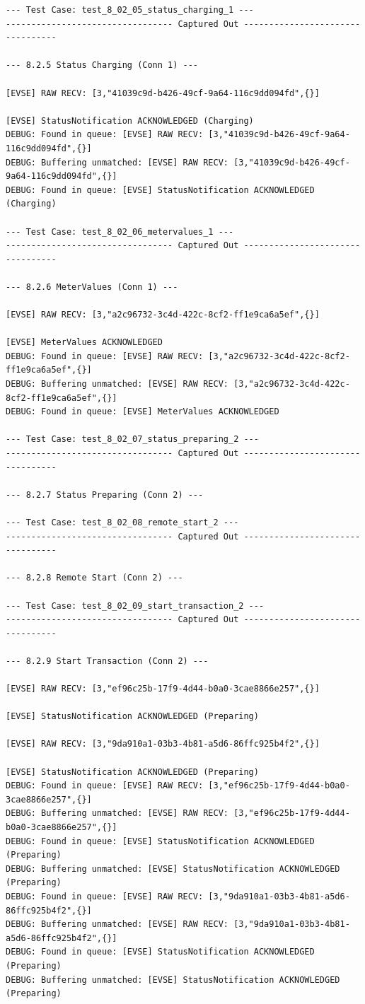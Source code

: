 \documentclass{article}
\begin{document}
\begin{lstlisting}
--- Test Case: test_8_02_05_status_charging_1 ---
--------------------------------- Captured Out ---------------------------------

--- 8.2.5 Status Charging (Conn 1) ---

[EVSE] RAW RECV: [3,"41039c9d-b426-49cf-9a64-116c9dd094fd",{}]

[EVSE] StatusNotification ACKNOWLEDGED (Charging)
DEBUG: Found in queue: [EVSE] RAW RECV: [3,"41039c9d-b426-49cf-9a64-116c9dd094fd",{}]
DEBUG: Buffering unmatched: [EVSE] RAW RECV: [3,"41039c9d-b426-49cf-9a64-116c9dd094fd",{}]
DEBUG: Found in queue: [EVSE] StatusNotification ACKNOWLEDGED (Charging)

--- Test Case: test_8_02_06_metervalues_1 ---
--------------------------------- Captured Out ---------------------------------

--- 8.2.6 MeterValues (Conn 1) ---

[EVSE] RAW RECV: [3,"a2c96732-3c4d-422c-8cf2-ff1e9ca6a5ef",{}]

[EVSE] MeterValues ACKNOWLEDGED
DEBUG: Found in queue: [EVSE] RAW RECV: [3,"a2c96732-3c4d-422c-8cf2-ff1e9ca6a5ef",{}]
DEBUG: Buffering unmatched: [EVSE] RAW RECV: [3,"a2c96732-3c4d-422c-8cf2-ff1e9ca6a5ef",{}]
DEBUG: Found in queue: [EVSE] MeterValues ACKNOWLEDGED

--- Test Case: test_8_02_07_status_preparing_2 ---
--------------------------------- Captured Out ---------------------------------

--- 8.2.7 Status Preparing (Conn 2) ---

--- Test Case: test_8_02_08_remote_start_2 ---
--------------------------------- Captured Out ---------------------------------

--- 8.2.8 Remote Start (Conn 2) ---

--- Test Case: test_8_02_09_start_transaction_2 ---
--------------------------------- Captured Out ---------------------------------

--- 8.2.9 Start Transaction (Conn 2) ---

[EVSE] RAW RECV: [3,"ef96c25b-17f9-4d44-b0a0-3cae8866e257",{}]

[EVSE] StatusNotification ACKNOWLEDGED (Preparing)

[EVSE] RAW RECV: [3,"9da910a1-03b3-4b81-a5d6-86ffc925b4f2",{}]

[EVSE] StatusNotification ACKNOWLEDGED (Preparing)
DEBUG: Found in queue: [EVSE] RAW RECV: [3,"ef96c25b-17f9-4d44-b0a0-3cae8866e257",{}]
DEBUG: Buffering unmatched: [EVSE] RAW RECV: [3,"ef96c25b-17f9-4d44-b0a0-3cae8866e257",{}]
DEBUG: Found in queue: [EVSE] StatusNotification ACKNOWLEDGED (Preparing)
DEBUG: Buffering unmatched: [EVSE] StatusNotification ACKNOWLEDGED (Preparing)
DEBUG: Found in queue: [EVSE] RAW RECV: [3,"9da910a1-03b3-4b81-a5d6-86ffc925b4f2",{}]
DEBUG: Buffering unmatched: [EVSE] RAW RECV: [3,"9da910a1-03b3-4b81-a5d6-86ffc925b4f2",{}]
DEBUG: Found in queue: [EVSE] StatusNotification ACKNOWLEDGED (Preparing)
DEBUG: Buffering unmatched: [EVSE] StatusNotification ACKNOWLEDGED (Preparing)


\end{lstlisting}
\end{document}
